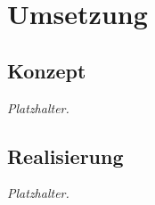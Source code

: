 \section{Umsetzung}
\label{sec:umsetzung}


\subsection{Konzept}
\label{sec:konzept}

\textit{Platzhalter.}

\subsection{Realisierung}
\label{sec:realisierung}

\textit{Platzhalter.}
